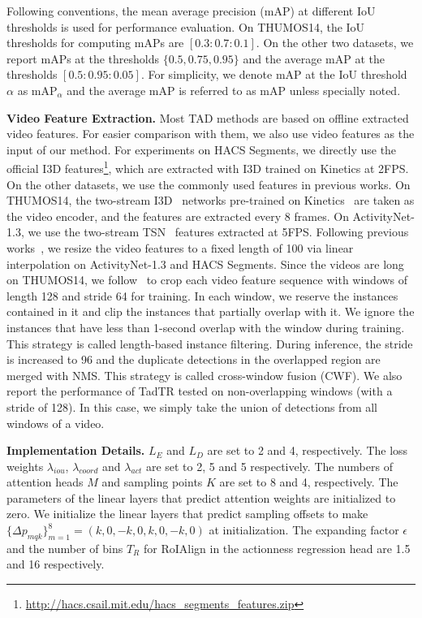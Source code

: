 \documentclass[lettersize,journal]{IEEEtran}
\begin{document}
Following conventions, the mean average precision (mAP) at different IoU thresholds is used for performance evaluation. On THUMOS14, the IoU thresholds for computing mAPs are $[0.3:0.7:0.1]$. On the other two datasets, we report mAPs at the thresholds $\{0.5, 0.75, 0.95\}$ and the average mAP at the thresholds $[0.5:0.95:0.05]$. For simplicity, we denote mAP at the IoU threshold $\alpha$ as mAP$_\alpha$ and the average mAP is referred to as mAP unless specially noted. 


\vspace{1ex} \noindent \textbf{Video Feature Extraction.} 
Most TAD methods are based on offline extracted video features. For easier comparison with them, we also use video features as the input of our method. For experiments on HACS Segments, we directly use the official I3D features\footnote{\url{http://hacs.csail.mit.edu/hacs_segments_features.zip}}, which are extracted with I3D trained on Kinetics at 2FPS.
On the other datasets, we use the commonly used features in previous works. On THUMOS14, the two-stream I3D~\cite{carreira2017quo} networks pre-trained on Kinetics~\cite{carreira2017quo} are taken as the video encoder, and the features are extracted every 8 frames. On ActivityNet-1.3, we use the two-stream TSN~\cite{wang2016temporal} features extracted at 5FPS. Following previous works~\cite{lin2019bmn,xu2020g}, we resize the video features to a fixed length of 100 via linear interpolation on ActivityNet-1.3 and HACS Segments. Since the videos are long on THUMOS14, we follow~\cite{lin2019bmn} to crop each video feature sequence with windows of length 128 and stride 64 for training. In each window, we reserve the instances contained in it and clip the instances that partially overlap with it. We ignore the instances that have less than 1-second overlap with the window during training. This strategy is called length-based instance filtering. During inference, the stride is increased to 96 and the duplicate detections in the overlapped region are merged with NMS. This strategy is called cross-window fusion (CWF). We also report the performance of TadTR tested on non-overlapping windows (with a stride of 128). In this case, we simply take the union of detections from all windows of a video. 


\vspace{1ex} \noindent \textbf{Implementation Details.}
$L_E$ and $L_D$ are set to 2 and 4, respectively.  The loss weights $\lambda_{iou}$, $\lambda_{coord}$ and $\lambda_{act}$ are set to 2, 5 and 5 respectively. 
The numbers of attention heads $M$ and sampling points $K$ are set to 8 and 4, respectively.
The parameters of the linear layers that predict attention weights are initialized to zero. We initialize the linear layers that predict sampling offsets to make $\{\Delta p_{mqk}\}_{m=1}^{8} =(k, 0, -k, 0, k, 0, -k, 0)$ at initialization. The expanding factor $\epsilon$ and the number of bins $T_R$ for RoIAlign in the actionness regression head are 1.5 and 16 respectively.
\end{document}
